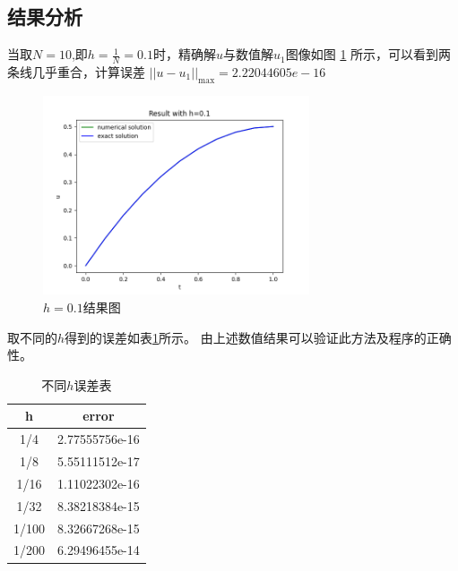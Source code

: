 \documentclass{ctexart}
\begin{document}
\subsection{结果分析}
当取$N=10$,即$h=\frac{1}{N}=0.1$时，精确解$u$与数值解$u_1$图像如图 \ref{Fig.main2} 所示，可以看到两条线几乎重合，计算误差
$||u-u_1||_{\max}=2.22044605e-16$
\begin{figure}[H] %
  \centering %
  \includegraphics[width=0.7\textwidth]{Figure_1.png} %
  \caption{$h=0.1$结果图} %
  \label{Fig.main2} %
\end{figure}
取不同的$h$得到的误差如表\ref{table1}所示。
由上述数值结果可以验证此方法及程序的正确性。

\begin{table}[]
  \centering
  \caption{不同$h$误差表}
  \begin{tabular}{@{}cc@{}}
  \toprule
  h     & error          \\ \midrule
  1/4   & 2.77555756e-16 \\
  1/8   & 5.55111512e-17 \\
  1/16  & 1.11022302e-16 \\
  1/32  & 8.38218384e-15 \\ 
  1/100 & 8.32667268e-15 \\
  1/200 & 6.29496455e-14 \\ \bottomrule
  \end{tabular}
  \label{table1}
  \end{table}
\end{document}
